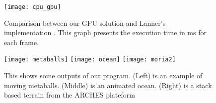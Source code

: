 \begin{figure}
\centering
\texttt{[image: cpu\_gpu]}
\caption{Comparison between our GPU solution and Lanner's implementation \cite{lanner}.
This graph presents the execution time in ms for each frame.
}
\label{cpu_gpu}
\end{figure}


\begin{figure*}
\centering
\texttt{[image: metaballs]}
\hfill
\texttt{[image: ocean]}
\hfill
\texttt{[image: moria2]}
\caption{This shows some outputs of our program. (Left) is an example of moving metaballs. (Middle) is an animated ocean. (Right) is a stack based terrain from the ARCHES plateform \cite{peytavie2009arches} }
\label{final_outputs}
\end{figure*}
